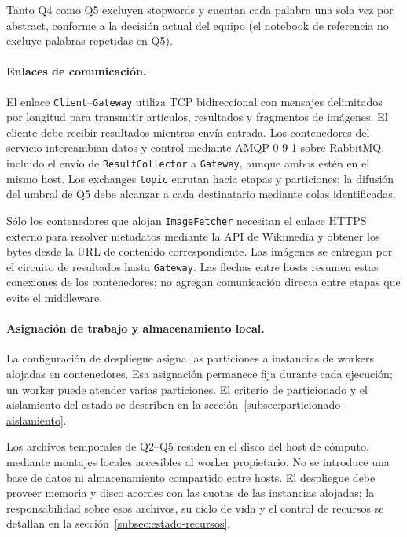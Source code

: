 Tanto Q4 como Q5 excluyen
stopwords y cuentan cada palabra una sola vez por abstract, conforme a la
decisión actual del equipo (el notebook de referencia no excluye palabras repetidas en Q5).

\paragraph{Enlaces de comunicación.}
El enlace \texttt{Client}--\texttt{Gateway} utiliza TCP bidireccional con
mensajes delimitados por longitud para transmitir artículos, resultados y
fragmentos de imágenes. El cliente debe recibir resultados mientras envía
entrada. Los contenedores del servicio intercambian datos y control mediante
AMQP 0-9-1 sobre RabbitMQ, incluido el envío de \texttt{ResultCollector} a
\texttt{Gateway}, aunque ambos estén en el mismo host. Los exchanges
\texttt{topic} enrutan hacia etapas y particiones; la difusión del umbral de Q5
debe alcanzar a cada destinatario mediante colas identificadas.

Sólo los contenedores que alojan \texttt{ImageFetcher} necesitan el enlace
HTTPS externo para resolver metadatos mediante la API de Wikimedia y obtener
los bytes desde la URL de contenido correspondiente. Las imágenes se entregan
por el circuito de resultados hasta \texttt{Gateway}. Las flechas entre hosts
resumen estas conexiones de los contenedores; no agregan comunicación directa
entre etapas que evite el middleware.

\paragraph{Asignación de trabajo y almacenamiento local.}
La configuración de despliegue asigna las particiones a instancias de workers
alojadas en contenedores. Esa asignación permanece fija durante cada ejecución;
un worker puede atender varias particiones. El criterio de particionado y el
aislamiento del estado se describen en la
sección~\ref{subsec:particionado-aislamiento}.

Los archivos temporales de Q2--Q5 residen en el disco del host de cómputo,
mediante montajes locales accesibles al worker propietario. No se introduce
una base de datos ni almacenamiento compartido entre hosts. El despliegue debe
proveer memoria y disco acordes con las cuotas de las instancias alojadas;
la responsabilidad sobre esos archivos, su ciclo de vida y el control de
recursos se detallan en la sección~\ref{subsec:estado-recursos}.

